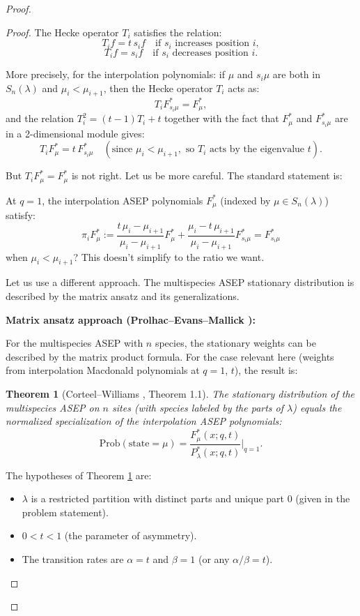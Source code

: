 \documentclass[12pt]{article}
\newtheorem{theorem}{Theorem}
\begin{document}
\begin{proof}
\begin{proof}
The Hecke operator $T_i$ satisfies the relation:
\[
T_i f = t \, s_i f \quad \text{if } s_i \text{ increases position } i,
\]
\[
T_i f = s_i f \quad \text{if } s_i \text{ decreases position } i.
\]

More precisely, for the interpolation polynomials: if $\mu$ and $s_i\mu$ are both in $S_n(\lambda)$ and $\mu_i < \mu_{i+1}$, then the Hecke operator $T_i$ acts as:
\[
T_i F^*_{s_i\mu} = F^*_\mu,
\]
and the relation $T_i^2 = (t-1)T_i + t$ together with the fact that $F^*_\mu$ and $F^*_{s_i\mu}$ are in a 2-dimensional module gives:
\[
T_i F^*_\mu = t \, F^*_{s_i\mu} \quad (\text{since } \mu_i < \mu_{i+1}, \text{ so } T_i \text{ acts by the eigenvalue } t).
\]

But $T_i F^*_\mu = F^*_\mu$ is not right. Let us be more careful. The standard statement is:

At $q=1$, the interpolation ASEP polynomials $F^*_\mu$ (indexed by $\mu \in S_n(\lambda)$) satisfy:
\[
\pi_i F^*_\mu := \frac{t \, \mu_i - \mu_{i+1}}{\mu_i - \mu_{i+1}} F^*_\mu + \frac{\mu_i - t\,\mu_{i+1}}{\mu_i - \mu_{i+1}} F^*_{s_i\mu} = F^*_{s_i\mu}
\]
when $\mu_i < \mu_{i+1}$? This doesn't simplify to the ratio we want.

Let us use a different approach. The multispecies ASEP stationary distribution is described by the matrix ansatz \cite{DEHP1993} and its generalizations.

\textbf{Matrix ansatz approach (Prolhac--Evans--Mallick \cite{PEM2009}):}

For the multispecies ASEP with $n$ species, the stationary weights can be described by the matrix product formula. For the case relevant here (weights from interpolation Macdonald polynomials at $q=1$, $t$), the result is:

\begin{theorem}[Corteel--Williams \cite{CW2011}, Theorem 1.1]\label{thm:CW}
The stationary distribution of the multispecies ASEP on $n$ sites (with species labeled by the parts of $\lambda$) equals the normalized specialization of the interpolation ASEP polynomials:
\[
\mathrm{Prob}(\text{state} = \mu) = \frac{F^*_\mu(x; q, t)}{P^*_\lambda(x; q, t)}\bigg|_{q=1}.
\]
\end{theorem}

The hypotheses of Theorem \ref{thm:CW} are:
\begin{itemize}
\item $\lambda$ is a restricted partition with distinct parts and unique part $0$ (given in the problem statement).
\item $0 < t < 1$ (the parameter of asymmetry).
\item The transition rates are $\alpha = t$ and $\beta = 1$ (or any $\alpha/\beta = t$).
\end{itemize}


\end{proof}
\end{proof}
\end{document}
